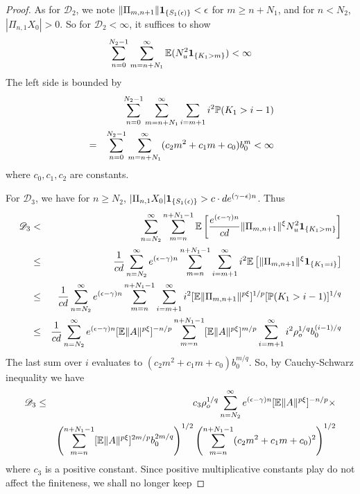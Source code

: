 \documentclass[aoas,preprint]{imsart}
\numberwithin{equation}{section}
\theoremstyle{plain}
\begin{document}
\begin{proof}
As for $\mathscr D_2$, we note
$\|\Pi_{m, n+1}\|\1{S_1(\epsilon)} < \epsilon$
for $m \geq n + N_1$, and for $n < N_2$,
$|\Pi_{n, 1} X_0| > 0$. So for $\mathscr D_2 < \infty$, it suffices to
show
\[
\sum_{n=0}^{N_2 - 1} \sum_{m=n+N_1}^\infty
\E (N_u^2 \1{K_1 > m}) < \infty
\]
The left side is bounded by
\begin{eqnarray*}
  &&
  \sum_{n=0}^{N_2 - 1} \sum_{m=n+N_1}^\infty \sum_{i=m+1}
  i^2 \P(K_1 > i - 1) \\
  &=&
  \sum_{n=0}^{N_2 - 1} \sum_{m=n+N_1}^\infty
  (c_2 m^2 + c_1 m + c_0)b_0^m < \infty
\end{eqnarray*}
where $c_0, c_1, c_2$ are constants.

For $\mathscr D_3$, we have for $n \geq N_2$,
$|\Pi_{n, 1} X_0| \1{S_1(\epsilon)} > c \cdot d e^{(\gamma - \epsilon) n}$.
Thus
\begin{eqnarray*}
  \mathscr D_3
  &<&
  \sum_{n=N_2}^\infty \sum_{m=n}^{n + N_1 - 1}
  \E \left[
    {
      e^{(\epsilon - \gamma) n}
      \over
      cd
    } \|\Pi_{m, n+1}\|^\xi
    N_u^2
    \1{K_1 > m}
    \right] \\
  &\leq&
  \frac{1}{cd}
  \sum_{n=N_2}^\infty
  e^{(\epsilon - \gamma) n}
  \sum_{m=n}^{n + N_1 - 1}
  \sum_{i=m+1}^\infty
  i^2
  \E \left[
    \|\Pi_{m, n+1}\|^\xi
    \1{K_1 = i}
    \right] \\
  &\leq&
  \frac{1}{cd}
  \sum_{n=N_2}^\infty
  e^{(\epsilon - \gamma) n}
  \sum_{m=n}^{n + N_1 - 1}
  \sum_{i=m+1}^\infty
  i^2
  [\E  \|\Pi_{m, n+1}\|^{p \xi}]^{1/p}
  [\P(K_1 > i-1)]^{1/q} \\
  &\leq&
  \frac{1}{cd}
  \sum_{n=N_2}^\infty
  e^{(\epsilon - \gamma) n}
  [\E \|A\|^{p \xi}]^{-n/p}
  \sum_{m=n}^{n + N_1 - 1}
   [\E  \|A\|^{p \xi}]^{m/p}
  \sum_{i=m+1}^\infty
  i^2 \rho_o^{1/q} b_0^{(i-1)/q}
\end{eqnarray*}
The last sum over $i$ evaluates to
$(c_2 m^2 + c_1 m + c_0) b_0^{m/q}$. So, by Cauchy-Schwarz inequality
we have
\begin{eqnarray*}
  \mathscr D_3
  &\leq&
  c_3 \rho_o^{1/q}
  \sum_{n=N_2}^\infty
  e^{(\epsilon - \gamma) n}
  [\E \|A\|^{p \xi}]^{-n/p} \times \\
  &&
  \left(
  \sum_{m=n}^{n + N_1 - 1}
      [\E  \|A\|^{p \xi}]^{2m/p}
      b_0^{2m/q}
 \right)^{1/2}
 \left(      
 \sum_{m=n}^{n + N_1 - 1}
 (c_2 m^2 + c_1 m + c_0)^2
  \right)^{1/2}
\end{eqnarray*}
where $c_3$ is a positive constant. Since positive multiplicative
constants play do not affect the finiteness, we shall no longer keep

\end{proof}
\end{document}
